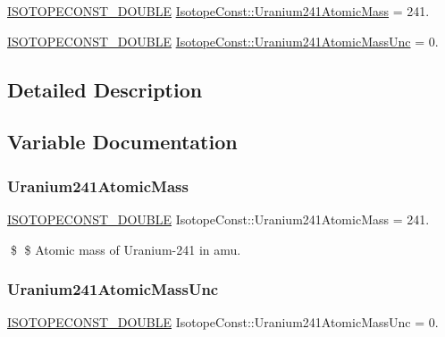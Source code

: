 \begin{DoxyCompactItemize}
\item 
\mbox{\hyperlink{group___isotope_const-_macros_ga8f45a7272ce02c0b4c65c44636ed719a}{I\+S\+O\+T\+O\+P\+E\+C\+O\+N\+S\+T\+\_\+\+D\+O\+U\+B\+LE}} \mbox{\hyperlink{group___isotope_const-_uranium-_u241_ga12f9b34681a6be779c68aa33e03e2c3c}{Isotope\+Const\+::\+Uranium241\+Atomic\+Mass}} = 241.
\item 
\mbox{\hyperlink{group___isotope_const-_macros_ga8f45a7272ce02c0b4c65c44636ed719a}{I\+S\+O\+T\+O\+P\+E\+C\+O\+N\+S\+T\+\_\+\+D\+O\+U\+B\+LE}} \mbox{\hyperlink{group___isotope_const-_uranium-_u241_ga6149a34282b0b6b528869ff441dcf86f}{Isotope\+Const\+::\+Uranium241\+Atomic\+Mass\+Unc}} = 0.
\end{DoxyCompactItemize}


\subsection{Detailed Description}


\subsection{Variable Documentation}
\mbox{\label{group___isotope_const-_uranium-_u241_ga12f9b34681a6be779c68aa33e03e2c3c}} 
\subsubsection{\texorpdfstring{Uranium241\+Atomic\+Mass}{Uranium241AtomicMass}}
{\footnotesize\ttfamily \mbox{\hyperlink{group___isotope_const-_macros_ga8f45a7272ce02c0b4c65c44636ed719a}{I\+S\+O\+T\+O\+P\+E\+C\+O\+N\+S\+T\+\_\+\+D\+O\+U\+B\+LE}} Isotope\+Const\+::\+Uranium241\+Atomic\+Mass = 241.}

\$ \$ Atomic mass of Uranium-\/241 in amu. \mbox{\label{group___isotope_const-_uranium-_u241_ga6149a34282b0b6b528869ff441dcf86f}} 
\subsubsection{\texorpdfstring{Uranium241\+Atomic\+Mass\+Unc}{Uranium241AtomicMassUnc}}
{\footnotesize\ttfamily \mbox{\hyperlink{group___isotope_const-_macros_ga8f45a7272ce02c0b4c65c44636ed719a}{I\+S\+O\+T\+O\+P\+E\+C\+O\+N\+S\+T\+\_\+\+D\+O\+U\+B\+LE}} Isotope\+Const\+::\+Uranium241\+Atomic\+Mass\+Unc = 0.}

